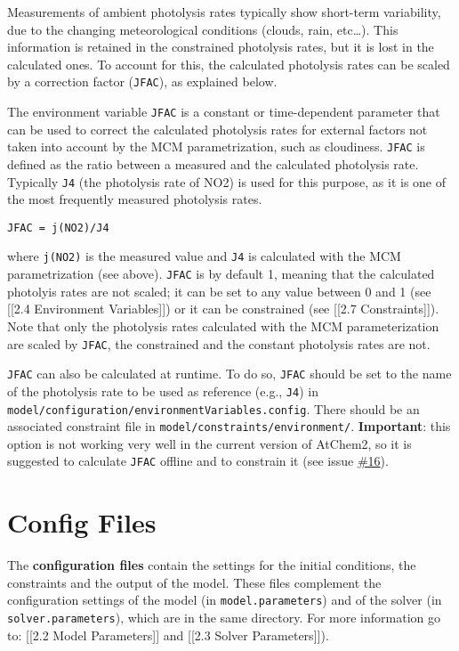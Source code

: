 Measurements of ambient photolysis rates typically show short-term
variability, due to the changing meteorological conditions (clouds,
rain, etc\ldots{}). This information is retained in the constrained
photolysis rates, but it is lost in the calculated ones. To account for
this, the calculated photolysis rates can be scaled by a correction
factor (\texttt{JFAC}), as explained below.

The environment variable \texttt{JFAC} is a constant or time-dependent
parameter that can be used to correct the calculated photolysis rates
for external factors not taken into account by the MCM parametrization,
such as cloudiness. \texttt{JFAC} is defined as the ratio between a
measured and the calculated photolysis rate. Typically \texttt{J4} (the
photolysis rate of NO2) is used for this purpose, as it is one of the
most frequently measured photolysis rates.

\begin{verbatim}
JFAC = j(NO2)/J4
\end{verbatim}

where \texttt{j(NO2)} is the measured value and \texttt{J4} is
calculated with the MCM parametrization (see above). \texttt{JFAC} is by
default 1, meaning that the calculated photolyis rates are not scaled;
it can be set to any value between 0 and 1 (see {[}{[}2.4 Environment
Variables{]}{]}) or it can be constrained (see {[}{[}2.7
Constraints{]}{]}). Note that only the photolysis rates calculated with
the MCM parameterization are scaled by \texttt{JFAC}, the constrained
and the constant photolysis rates are not.

\texttt{JFAC} can also be calculated at runtime. To do so, \texttt{JFAC}
should be set to the name of the photolysis rate to be used as reference
(e.g., \texttt{J4}) in
\texttt{model/configuration/environmentVariables.config}. There should
be an associated constraint file in
\texttt{model/constraints/environment/}. \textbf{Important}: this option
is not working very well in the current version of AtChem2, so it is
suggested to calculate \texttt{JFAC} offline and to constrain it (see
issue \href{https://github.com/AtChem/AtChem2/issues/16}{\#16}).

\section{Config Files} \label{sec:config}

The \textbf{configuration files} contain the settings for the initial
conditions, the constraints and the output of the model. These files
complement the configuration settings of the model (in
\texttt{model.parameters}) and of the solver (in
\texttt{solver.parameters}), which are in the same directory. For more
information go to: {[}{[}2.2 Model Parameters{]}{]} and {[}{[}2.3 Solver
Parameters{]}{]}).

